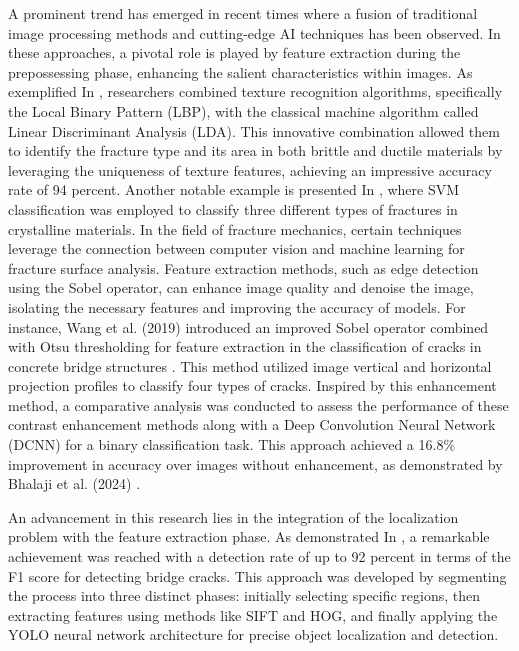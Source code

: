 \documentclass{ieeeaccess}
\begin{document}
A prominent trend has emerged in recent times where a fusion of traditional image processing methods and cutting-edge AI techniques has been observed.
In these approaches, a pivotal role is played by feature extraction during the prepossessing phase, enhancing the salient characteristics within images.
As exemplified In \cite{naik2019identification}, researchers combined texture recognition algorithms, specifically the Local Binary Pattern (LBP), with the classical machine algorithm called Linear Discriminant Analysis (LDA). This innovative combination allowed them to identify the fracture type and its area in both brittle and ductile materials by leveraging the uniqueness of texture features, achieving an impressive accuracy rate of 94 percent.
Another notable example is presented In \cite{bastidas2016fractographic}, where SVM classification was employed to classify three different types of fractures in crystalline materials.
In the field of fracture mechanics, certain techniques leverage the connection between computer vision and machine learning for fracture surface analysis. Feature extraction methods, such as edge detection using the Sobel operator, can enhance image quality and denoise the image, isolating the necessary features and improving the accuracy of models. For instance, Wang et al. (2019) introduced an improved Sobel operator combined with Otsu thresholding for feature extraction in the classification of cracks in concrete bridge structures \cite{wang2019research}. This method utilized image vertical and horizontal projection profiles to classify four types of cracks.
Inspired by this enhancement method, a comparative analysis was conducted to assess the performance of these contrast enhancement methods along with a Deep Convolution Neural Network (DCNN) for a binary classification task. This approach achieved a 16.8\% improvement in accuracy over images without enhancement, as demonstrated by Bhalaji et al. (2024) \cite{bhalaji2024transfer}.

An advancement in this research lies in the integration of the localization problem with the feature extraction phase.
As demonstrated In \cite{zhang2023automated}, a remarkable achievement was reached with a detection rate of up to 92 percent in terms of the F1 score for detecting bridge cracks.
This approach was developed by segmenting the process into three distinct phases: initially selecting specific regions, then extracting features using methods like SIFT and HOG, and finally applying the YOLO neural network architecture for precise object localization and detection.
\end{document}
